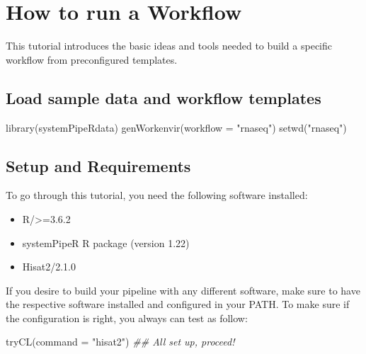 \documentclass[14pt,]{article}
\providecommand{\tightlist}{%
  \setlength{\itemsep}{0pt}\setlength{\parskip}{0pt}}
\newcommand{\hlstr}[1]{\textcolor[rgb]{0.251,0.627,0.251}{#1}}%
\newcommand{\hlcom}[1]{\textcolor[rgb]{0.502,0.502,0.502}{\textit{#1}}}%
\newcommand{\hlstd}[1]{\textcolor[rgb]{0.251,0.251,0.251}{#1}}%
\newenvironment{Shaded}{\begin{myshaded}}{\end{myshaded}}
\newcommand{\StringTok}[1]{\hlstr{#1}}
\newcommand{\DocumentationTok}[1]{\hlcom{#1}}
\newcommand{\FunctionTok}[1]{\hlstd{#1}}
\newcommand{\AttributeTok}[1]{{#1}}
\newcommand{\NormalTok}[1]{\hlstd{#1}}
\begin{document}
\hypertarget{how-to-run-a-workflow}{%
\section{How to run a Workflow}\label{how-to-run-a-workflow}}

This tutorial introduces the basic ideas and tools needed to build a specific workflow from preconfigured templates.

\hypertarget{load-sample-data-and-workflow-templates-1}{%
\subsection{Load sample data and workflow templates}\label{load-sample-data-and-workflow-templates-1}}

\begin{Shaded}
\begin{Highlighting}[]
\FunctionTok{library}\NormalTok{(systemPipeRdata)}
\FunctionTok{genWorkenvir}\NormalTok{(}\AttributeTok{workflow =} \StringTok{"rnaseq"}\NormalTok{)}
\FunctionTok{setwd}\NormalTok{(}\StringTok{"rnaseq"}\NormalTok{)}
\end{Highlighting}
\end{Shaded}

\hypertarget{setup-and-requirements}{%
\subsection{Setup and Requirements}\label{setup-and-requirements}}

To go through this tutorial, you need the following software installed:

\begin{itemize}
\tightlist
\item
  R/\textgreater=3.6.2
\item
  systemPipeR R package (version 1.22)
\item
  Hisat2/2.1.0
\end{itemize}

If you desire to build your pipeline with any different software, make sure to have the respective software installed and configured in your PATH. To make sure if the configuration is right, you always can test as follow:

\begin{Shaded}
\begin{Highlighting}[]
\FunctionTok{tryCL}\NormalTok{(}\AttributeTok{command =} \StringTok{"hisat2"}\NormalTok{)  }\DocumentationTok{\#\# \textquotesingle{}All set up, proceed!\textquotesingle{}}
\end{Highlighting}
\end{Shaded}
\end{document}
